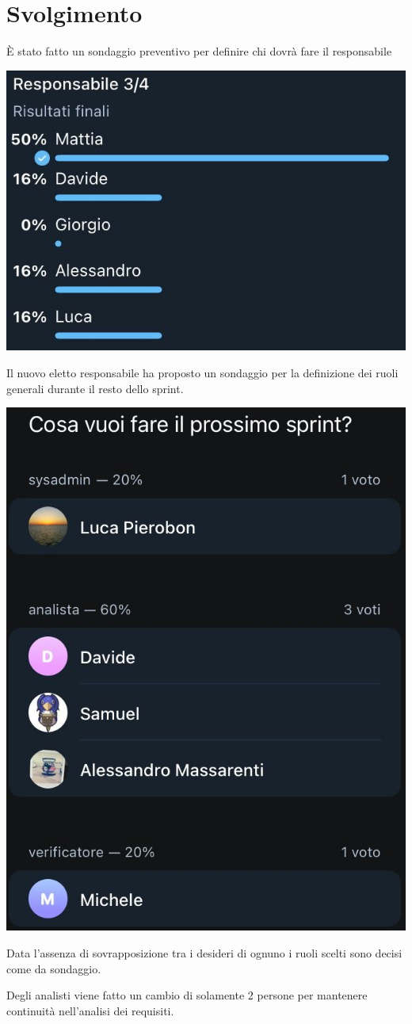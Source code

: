 \section{Svolgimento}

È stato fatto un sondaggio preventivo per definire chi dovrà fare il responsabile
\begin{center}
\includegraphics[width = 0.5\linewidth]{img/sondaggio_resposabile.png}
\end{center}

Il nuovo eletto responsabile ha proposto un sondaggio per la definizione dei ruoli generali durante il resto dello sprint.

\begin{center}
    \includegraphics[width = 0.4\linewidth]{img/ruoli.png}
\end{center}

Data l'assenza di sovrapposizione tra i desideri di ognuno i ruoli scelti sono decisi come da sondaggio.

Degli analisti viene fatto un cambio di solamente 2 persone per mantenere continuità nell'analisi dei requisiti.
